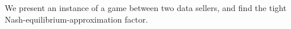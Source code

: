 We present an instance of a game between two data sellers,
and find the tight Nash-equilibrium-approximation factor.
